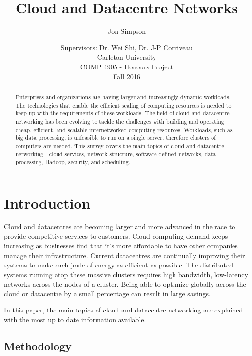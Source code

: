 \documentclass[12pt]{article}
\title{Cloud and Datacentre Networks}
\author{Jon Simpson}
\date{
\small{Supervisors: Dr. Wei Shi, Dr. J-P Corriveau\\
Carleton University\\
COMP 4905 - Honours Project\\
Fall 2016}}
\begin{document}

\maketitle
\thispagestyle{empty}

\begin{abstract}
    Enterprises and organizations are having larger and increasingly dynamic workloads. The technologies that enable the efficient scaling of computing resources is needed to keep up with the requirements of these workloads. The field of cloud and datacentre networking has been evolving to tackle the challenges with building and operating cheap, efficient, and scalable internetworked computing resources. Workloads, such as big data processing, is unfeasible to run on a single server, therefore clusters of computers are needed. This survey covers the main topics of cloud and datacentre networking - cloud services, network structure, software defined networks, data processing, Hadoop, security, and scheduling.
\end{abstract}
\newpage

\tableofcontents


\section{Introduction} \label{sec:introduction}

Cloud and datacentres are becoming larger and more advanced in the race to provide competitive services to customers. Cloud computing demand keeps increasing as businesses find that it's more affordable to have other companies manage their infrastructure. Current datacentres are continually improving their systems to make each joule of energy as efficient as possible. The distributed systems running atop these massive clusters requires high bandwidth, low-latency networks across the nodes of a cluster. Being able to optimize globally across the cloud or datacentre by a small percentage can result in large savings.

In this paper, the main topics of cloud and datacentre networking are explained with the most up to date information available.


\subsection{Methodology} \label{sub:methodology}
\end{document}
